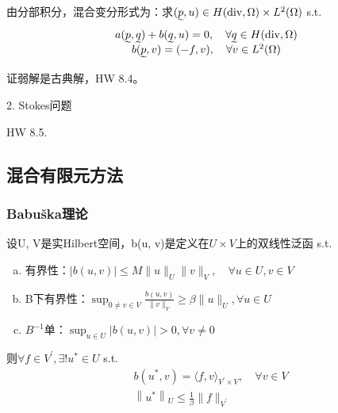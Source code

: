 由分部积分，混合变分形式为：求$(\undertilde{p}, u) \in H(\operatorname{div}, \Omega) \times L^{2}(\Omega)$ s.t.
\[
  \begin{array}{c}
    a(\undertilde{p}, \undertilde{q})+b(\undertilde{q}, u)=0, \quad \forall \undertilde{q} \in H(\operatorname{div}, \Omega) \\
    b(\undertilde{p}, v)=(-f, v), \quad \forall v \in L^{2}(\Omega)
  \end{array}
\]

证弱解是古典解，HW 8.4。

2. Stokes问题

HW 8.5.

\subsection{混合有限元方法}

\subsubsection{Babuška理论}

\begin{thm}
  设U, V是实Hilbert空间，b(u, v)是定义在$U \times V$上的双线性泛函 s.t. 
  \begin{enumerate}[a.]
    \item 有界性：$|b(u, v)| \le M\|u\|_{U}\|v\|_{V}, \quad \forall u \in U, v \in V$
    \item B下有界性：$\sup_{0 \neq v \in V} \frac{b(u, v)}{\|v\|_{V}} \ge \beta\|u\|_{U}, \forall u \in U$
    \item $B^{-1}$单：$\sup _{u \in U}|b(u, v)|>0, \forall v \neq 0$
  \end{enumerate}
  
  则$\forall f \in V^{\prime}, \exists ! u^{\ast} \in U$ s.t.
  \[
    \begin{aligned}
      &b\left(u^{\ast}, v\right)=\langle f, v\rangle_{V^{\prime} \times V}, \quad \forall v \in V\\
      &\left\|u^{\ast}\right\|_{U} \le \frac{1}{\beta}\|f\|_{V^{\prime}}
    \end{aligned}
  \]
\end{thm}

